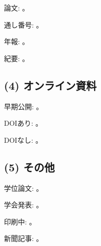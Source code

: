 \documentclass[a4paper]{jlreq}
\begin{document}
論文: \textcite{Kawakami2019}。

通し番号: \textcite{Saito2019}。

年報: \textcite{Homusogo2019}。

紀要: \textcite{Nakamichi2019}。

\subsection{(4) オンライン資料}

早期公開: \textcite{Kanemasa2021}。

DOIあり: \textcite{Yajima2013}。

DOIなし: \textcite{JPA2022}。

\subsection{(5) その他}

学位論文: \textcite{Mukaida2009}。

学会発表: \textcite{Tsuzuki2018}。

印刷中: \textcite{Hasegawa2024inpress}。

新聞記事: \textcite{Sato2013}。


\printbibliography[title=引用文献]
\end{document}
